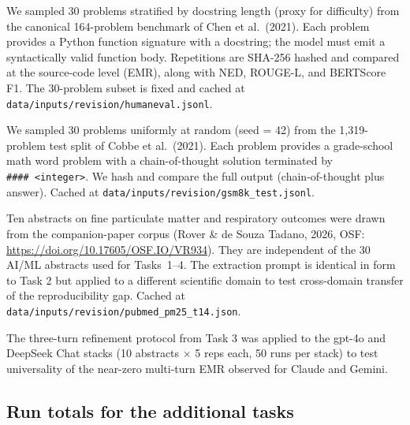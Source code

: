 \documentclass[11pt]{article}
\begin{document}
\begin{description}[leftmargin=*]
  \item[\textbf{HumanEval (code generation)}.] We sampled 30 problems stratified by docstring length (proxy for difficulty) from the canonical 164-problem benchmark of Chen et al.\ (2021). Each problem provides a Python function signature with a docstring; the model must emit a syntactically valid function body. Repetitions are SHA-256 hashed and compared at the source-code level (EMR), along with NED, ROUGE-L, and BERTScore F1. The 30-problem subset is fixed and cached at \texttt{data/inputs/revision/humaneval.jsonl}.
  \item[\textbf{GSM8K (math reasoning)}.] We sampled 30 problems uniformly at random (seed = 42) from the 1{,}319-problem test split of Cobbe et al.\ (2021). Each problem provides a grade-school math word problem with a chain-of-thought solution terminated by \texttt{\#\#\#\#\ <integer>}. We hash and compare the full output (chain-of-thought plus answer). Cached at \texttt{data/inputs/revision/gsm8k\_test.jsonl}.
  \item[\textbf{PubMed PM\textsubscript{2.5}/respiratory health (out-of-AI/ML structured extraction)}.] Ten abstracts on fine particulate matter and respiratory outcomes were drawn from the companion-paper corpus (Rover \& de Souza Tadano, 2026, OSF: \url{https://doi.org/10.17605/OSF.IO/VR934}). They are independent of the 30 AI/ML abstracts used for Tasks~1--4. The extraction prompt is identical in form to Task 2 but applied to a different scientific domain to test cross-domain transfer of the reproducibility gap. Cached at \texttt{data/inputs/revision/pubmed\_pm25\_t14.json}.
  \item[\textbf{Multi-turn extension to gpt-4o and DeepSeek Chat}.] The three-turn refinement protocol from Task 3 was applied to the gpt-4o and DeepSeek Chat stacks (10 abstracts $\times$ 5 reps each, 50 runs per stack) to test universality of the near-zero multi-turn EMR observed for Claude and Gemini.
\end{description}

\subsection{Run totals for the additional tasks}
\end{document}
